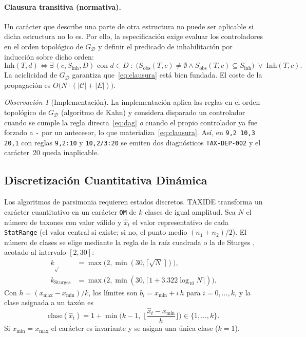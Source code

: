 \documentclass[11pt,a4paper]{article}
\theoremstyle{definition}
\theoremstyle{remark}
\newtheorem*{observacion}{Observación}
\newcommand{\Sobs}{S_{\text{obs}}}
\newcommand{\Sinh}{S_{\text{inh}}}
\begin{document}
\paragraph{Clausura transitiva (normativa).} Un carácter que describe una parte de otra estructura no puede ser aplicable si dicha estructura no lo es. Por ello, la especificación exige evaluar los controladores en el orden topológico de $G_{\mathcal{D}}$ y definir el predicado de inhabilitación por inducción sobre dicho orden:
\begin{equation}
\label{eq:clausura}
\mathrm{Inh}(T, d) \iff \exists\, (c, \Sinh, D) \text{ con } d \in D \;:\; \big(\Sobs(T,c) \neq \emptyset \land \Sobs(T,c) \subseteq \Sinh\big) \;\lor\; \mathrm{Inh}(T, c).
\end{equation}
La aciclicidad de $G_{\mathcal{D}}$ garantiza que~\eqref{eq:clausura} está bien fundada. El coste de la propagación es $O\big(N \cdot (|\mathcal{C}| + |E|)\big)$.

\begin{observacion}[Implementación]
La implementación aplica las reglas en el orden topológico de $G_{\mathcal{D}}$ (algoritmo de Kahn) y considera disparado un controlador cuando se cumple la regla directa~\eqref{eq:dag} \emph{o} cuando el propio controlador ya fue forzado a \texttt{-} por un antecesor, lo que materializa~\eqref{eq:clausura}. Así, en \texttt{9,2 10,3 20,1} con reglas \texttt{9,2:10} y \texttt{10,2/3:20} se emiten dos diagnósticos \texttt{TAX-DEP-002} y el carácter~20 queda inaplicable.
\end{observacion}

\subsection{Discretización Cuantitativa Dinámica}
\label{sec:discretizacion}
Los algoritmos de parsimonia requieren estados discretos. TAXIDE transforma un carácter cuantitativo en un carácter \texttt{OM} de $k$ clases de igual amplitud. Sea $N$ el número de taxones con valor válido y $\hat{x}_t$ el valor representativo de cada \texttt{StatRange} (el valor central si existe; si no, el punto medio $(n_1+n_2)/2$). El número de clases se elige mediante la regla de la raíz cuadrada o la de Sturges \cite{sturges1926}, acotado al intervalo $[2, 30]$:
\begin{align}
k_{\sqrt{}} &= \max\big(2, \min(30, \lceil \sqrt{N}\, \rceil)\big), \\
k_{\text{Sturges}} &= \max\big(2, \min(30, \lceil 1 + 3.322 \log_{10} N \rceil)\big).
\end{align}
Con $h = (x_{\max} - x_{\min})/k$, los límites son $b_i = x_{\min} + i\,h$ para $i = 0,\dots,k$, y la clase asignada a un taxón es
\begin{equation}
\mathrm{clase}(\hat{x}_t) = 1 + \min\!\Big(k - 1,\; \Big\lfloor \frac{\hat{x}_t - x_{\min}}{h} \Big\rfloor\Big) \in \{1, \dots, k\}.
\end{equation}
Si $x_{\min} = x_{\max}$ el carácter es invariante y se asigna una única clase ($k = 1$).
\end{document}
